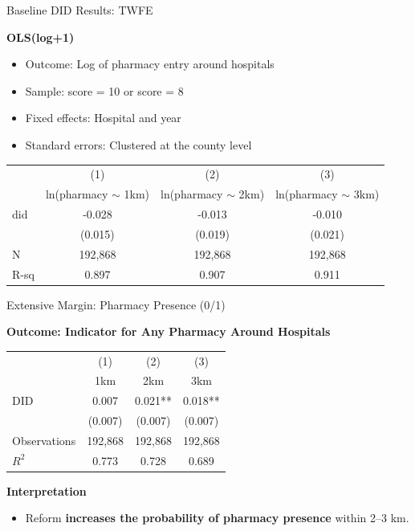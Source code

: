 \documentclass{beamer}
\begin{document}
\begin{frame}{Baseline DID Results: TWFE}

\textbf{OLS(log+1)}

\begin{itemize}
    \item Outcome: Log of pharmacy entry around hospitals
    \item Sample: score = 10 or score = 8
    \item Fixed effects: Hospital and year
    \item Standard errors: Clustered at the county level
\end{itemize}

\vspace{0.5em}
\centering
\footnotesize
\begin{tabular}{lccc}
\hline
\hline
 & (1) & (2) & (3) \\
 & ln(pharmacy $\sim$ 1km) & ln(pharmacy $\sim$ 2km) & ln(pharmacy $\sim$ 3km) \\
\hline
did & -0.028 & -0.013 & -0.010 \\
    & (0.015) & (0.019) & (0.021) \\
\hline
N & 192,868 & 192,868 & 192,868 \\
R-sq & 0.897 & 0.907 & 0.911 \\
\hline
\hline
\end{tabular}

\end{frame}


\begin{frame}{Extensive Margin: Pharmacy Presence (0/1)}

\textbf{Outcome: Indicator for Any Pharmacy Around Hospitals}

\begin{table}[htbp]
\centering
\small
\begin{tabular}{lccc}
\toprule
 & (1) & (2) & (3) \\
 & 1km & 2km & 3km \\
\midrule
DID & 0.007 & 0.021** & 0.018** \\
    & (0.007) & (0.007) & (0.007) \\
\midrule
Observations & 192,868 & 192,868 & 192,868 \\
$R^2$ & 0.773 & 0.728 & 0.689 \\
\bottomrule
\end{tabular}
\end{table}

\vspace{0.3cm}

\textbf{Interpretation}
\begin{itemize}
    \item Reform \textbf{increases the probability of pharmacy presence} within 2–3 km.
\end{itemize}

\end{frame}
\end{document}

